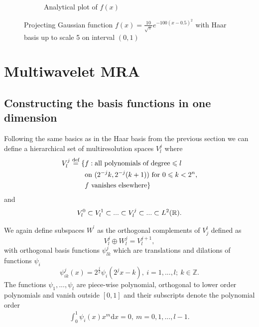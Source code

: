 \documentclass[../Thesis.tex]{subfiles}
\begin{document}
\begin{figure}[h!]
\begin{subfigure}[b]{0.49\linewidth}
    \caption{Analytical plot of $f(x)$}
  \end{subfigure}
  \caption[Projecting a Gaussian function with Haar basis]{Projecting Gaussian function $f(x) = \frac{10}{\sqrt{\pi}}e^{-100(x - 0.5)^2}$ with
  Haar basis up to scale 5 on interval $(0, 1)$}
  \label{fig:Hargaussproject}
\end{figure}


\section{Multiwavelet \ac{MRA}}
\subsection{Constructing the basis functions in one dimension}
Following the same basics as in the Haar basis from the previous section we can
define a hierarchical set of multiresolution spaces $V^j_l$ where \cite{Frediani:2013}
\begin{align}
  \begin{split}
    V^j_l \stackrel{\text{def}}{=} \{&f: \text{all polynomials of degree} \leqslant
    l\  \\
    &\text{on}\  (2^{-j}k,2^{-j}(k+1))\ \text{for}\ 0\leqslant k < 2^{n},\\
    &f\  \text{vanishes elsewhere}\}
  \end{split}
\end{align}
and
\begin{equation}
  V^0_l \subset V^1_l \subset ... \subset V_l^j \subset ... \subset L^2(\mathbb{R}).
\end{equation}

We again define subspaces $W^^l$ as the orthogonal complements of $V^l_j$
\cite{Alpert1993} defined as
\begin{equation}
  V_l^j \oplus W^j_l = V_l^{j+1},
\end{equation}
 with orthogonal basis functions  $\psi^j_{lk}$ which are translations and dilations of functions $\psi_i$
 \begin{equation}
   \psi^j_{ik}(x) = 2^\frac{j}{2}\psi_i(2^jx-k), \ i=1, ...,l;\ k \in \mathbb{Z}.\label{eq:mwbasisfuncs}
 \end{equation}
 The functions $\psi_1, ...,\psi_l$ are piece-wise polynomial, orthogonal to lower order polynomials and
 vanish outside $[0,1]$ and their subscripts denote the polynomial order \cite{Alpert1993}
\begin{align}
  \int_0^1\psi_i(x)x^m \text{d}x = 0,\ m = 0, 1, ..., l-1.
\end{align}
\end{document}
